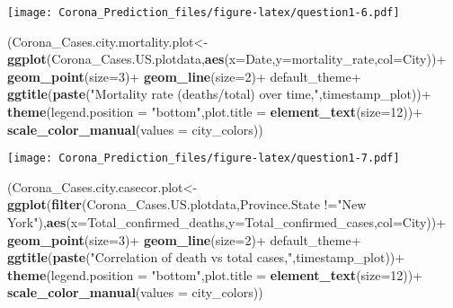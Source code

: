 \documentclass[]{article}
\newenvironment{Shaded}{\begin{snugshade}}{\end{snugshade}}
\newcommand{\KeywordTok}[1]{\textcolor[rgb]{0.13,0.29,0.53}{\textbf{{#1}}}}
\newcommand{\DataTypeTok}[1]{\textcolor[rgb]{0.13,0.29,0.53}{{#1}}}
\newcommand{\DecValTok}[1]{\textcolor[rgb]{0.00,0.00,0.81}{{#1}}}
\newcommand{\StringTok}[1]{\textcolor[rgb]{0.31,0.60,0.02}{{#1}}}
\newcommand{\NormalTok}[1]{{#1}}
\begin{document}
\texttt{[image: Corona\_Prediction\_files/figure-latex/question1-6.pdf]}

\begin{Shaded}
\begin{Highlighting}[]
\NormalTok{(Corona_Cases.city.mortality.plot<-}\KeywordTok{ggplot}\NormalTok{(Corona_Cases.US.plotdata,}\KeywordTok{aes}\NormalTok{(}\DataTypeTok{x=}\NormalTok{Date,}\DataTypeTok{y=}\NormalTok{mortality_rate,}\DataTypeTok{col=}\NormalTok{City))+}
\StringTok{  }\KeywordTok{geom_point}\NormalTok{(}\DataTypeTok{size=}\DecValTok{3}\NormalTok{)+}
\StringTok{  }\KeywordTok{geom_line}\NormalTok{(}\DataTypeTok{size=}\DecValTok{2}\NormalTok{)+}
\StringTok{  }\NormalTok{default_theme+}
\StringTok{  }\KeywordTok{ggtitle}\NormalTok{(}\KeywordTok{paste}\NormalTok{(}\StringTok{"Mortality rate (deaths/total) over time,"}\NormalTok{,timestamp_plot))+}
\StringTok{  }\KeywordTok{theme}\NormalTok{(}\DataTypeTok{legend.position =} \StringTok{"bottom"}\NormalTok{,}\DataTypeTok{plot.title =} \KeywordTok{element_text}\NormalTok{(}\DataTypeTok{size=}\DecValTok{12}\NormalTok{))+}
\StringTok{  }\KeywordTok{scale_color_manual}\NormalTok{(}\DataTypeTok{values =} \NormalTok{city_colors))}
\end{Highlighting}
\end{Shaded}

\texttt{[image: Corona\_Prediction\_files/figure-latex/question1-7.pdf]}

\begin{Shaded}
\begin{Highlighting}[]
\NormalTok{(Corona_Cases.city.casecor.plot<-}\KeywordTok{ggplot}\NormalTok{(}\KeywordTok{filter}\NormalTok{(Corona_Cases.US.plotdata,Province.State !=}\StringTok{"New York"}\NormalTok{),}\KeywordTok{aes}\NormalTok{(}\DataTypeTok{x=}\NormalTok{Total_confirmed_deaths,}\DataTypeTok{y=}\NormalTok{Total_confirmed_cases,}\DataTypeTok{col=}\NormalTok{City))+}
\StringTok{  }\KeywordTok{geom_point}\NormalTok{(}\DataTypeTok{size=}\DecValTok{3}\NormalTok{)+}
\StringTok{  }\KeywordTok{geom_line}\NormalTok{(}\DataTypeTok{size=}\DecValTok{2}\NormalTok{)+}
\StringTok{  }\NormalTok{default_theme+}
\StringTok{  }\KeywordTok{ggtitle}\NormalTok{(}\KeywordTok{paste}\NormalTok{(}\StringTok{"Correlation of death vs total cases,"}\NormalTok{,timestamp_plot))+}
\StringTok{  }\KeywordTok{theme}\NormalTok{(}\DataTypeTok{legend.position =} \StringTok{"bottom"}\NormalTok{,}\DataTypeTok{plot.title =} \KeywordTok{element_text}\NormalTok{(}\DataTypeTok{size=}\DecValTok{12}\NormalTok{))+}
\StringTok{  }\KeywordTok{scale_color_manual}\NormalTok{(}\DataTypeTok{values =} \NormalTok{city_colors))}
\end{Highlighting}
\end{Shaded}
\end{document}
